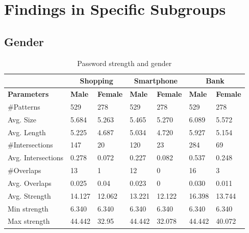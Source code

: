 \section{Findings in Specific Subgroups}

	\subsection{Gender}

		\begin{table}[H]
      \centering
      \begin{tabular}{l || l | l || l | l || l | l }
        \hline
         & \multicolumn{2}{c||}{\bf Shopping} & \multicolumn{2}{c||}{\bf Smartphone} &\multicolumn{2}{c}{\bf Bank} \\ \hline
        {\bf Parameters}   & {\bf Male} & {\bf Female} & {\bf Male} & {\bf Female} & {\bf Male} & {\bf Female}\\ \hline
        \#Patterns         & 529    & 278    & 529    & 278    & 529    & 278  	 \\
        Avg. Size          & 5.684  & 5.263  & 5.465  & 5.270  & 6.089  & 5.572  \\
        Avg. Length        & 5.225  & 4.687  & 5.034  & 4.720  & 5.927  & 5.154  \\
        \#Intersections    & 147 		& 20     & 120    & 23     & 284    & 69     \\
        Avg. Intersections & 0.278  & 0.072  & 0.227  & 0.082  & 0.537  & 0.248  \\
        \#Overlaps         & 13     & 1      & 12     & 0      & 16     & 3  		 \\
        Avg. Overlaps      & 0.025  & 0.04   & 0.023  & 0      & 0.030  & 0.011  \\ \hline
        Avg. Strength      & 14.127 & 12.062 & 13.221 & 12.122 & 16.398 & 13.744 \\ 
        Min strength       & 6.340  & 6.340  & 6.340  & 6.340  & 6.340  & 6.340  \\
        Max strength       & 44.442 & 32.95  & 44.442 & 32.078 & 44.442 & 40.072 \\ \hline
      \end{tabular}
      \caption{Password strength and gender }
      \label{tab:gendertrength}
    \end{table}

